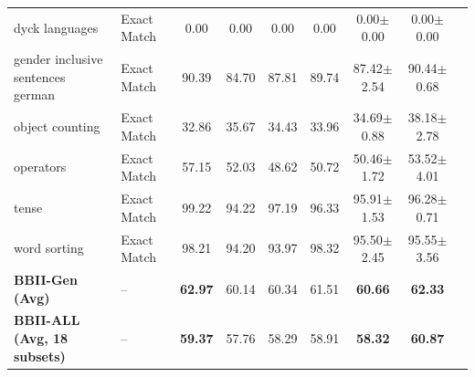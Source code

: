 \begin{table}[htbp]
{\begin{tabular}{@{}llccccccc@{}}
dyck languages & Exact Match & 0.00 & 0.00 & 0.00 & 0.00 & 0.00$\pm$0.00 & 0.00$\pm$0.00 \\
gender inclusive sentences german & Exact Match & 90.39 & 84.70 & 87.81 & 89.74 & 87.42$\pm$2.54 & 90.44$\pm$0.68 \\
object counting & Exact Match & 32.86 & 35.67 & 34.43 & 33.96 & 34.69$\pm$0.88 & 38.18$\pm$2.78 \\
operators & Exact Match & 57.15 & 52.03 & 48.62 & 50.72 & 50.46$\pm$1.72 & 53.52$\pm$4.01 \\
tense & Exact Match & 99.22 & 94.22 & 97.19 & 96.33 & 95.91$\pm$1.53 & 96.28$\pm$0.71 \\
word sorting & Exact Match & 98.21 & 94.20 & 93.97 & 98.32 & 95.50$\pm$2.45 & 95.55$\pm$3.56 \\
\midrule
\textbf{BBII-Gen (Avg)} & -- & \textbf{62.97} & 60.14 & 60.34 & 61.51 & \textbf{60.66} & \textbf{62.33} \\
\midrule
\textbf{BBII-ALL (Avg, 18 subsets)} & -- & \textbf{59.37} & 57.76 & 58.29 & 58.91 & \textbf{58.32} & \textbf{60.87} \\
\bottomrule
\end{tabular}
}
\end{table}
